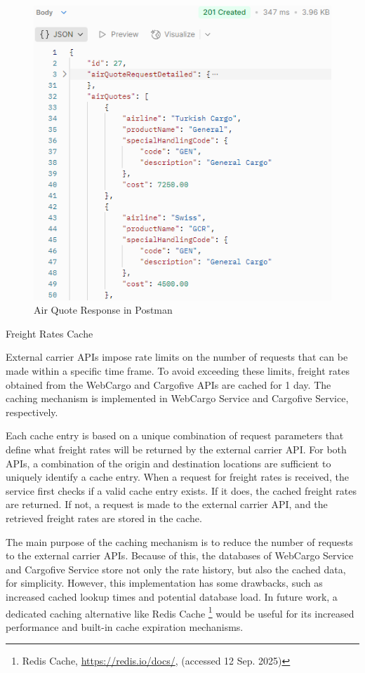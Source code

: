 \documentclass[12pt, reqno, oneside]{amsbook}
\makeatletter
\def\subsection{\@startsection{subsection}{2}%
      \z@{.5\linespacing\@plus.7\linespacing}{.25\linespacing}%
      {\normalfont\bfseries\flushleft}}
\theoremstyle{definition}
\theoremstyle{definition}
\numberwithin{section}{chapter}
\numberwithin{table}{chapter}
\numberwithin{figure}{chapter}
\makeatother
\begin{document}
\begin{figure}[H]
  \centering
  \includegraphics[width=0.8\linewidth]{images/AirQuoteResponsePostman.png}
  \caption{\label{Figure:AirQuoteResponsePostman}Air Quote Response in Postman}
\end{figure}

\pagebreak

\subsection{Freight Rates Cache}
\label{Subsection:Freight_Rates_Cache}

External carrier \acp{API} impose rate limits on the number of requests that can be made within a specific time frame. To avoid exceeding these limits, freight rates obtained from the WebCargo and Cargofive \Acp{API} are cached for 1 day. The caching mechanism is implemented in WebCargo Service and Cargofive Service, respectively.

Each cache entry is based on a unique combination of request parameters that define what freight rates will be returned by the external carrier \ac{API}. For both \acp{API}, a combination of the origin and destination locations are sufficient to uniquely identify a cache entry. When a request for freight rates is received, the service first checks if a valid cache entry exists. If it does, the cached freight rates are returned. If not, a request is made to the external carrier \ac{API}, and the retrieved freight rates are stored in the cache.

The main purpose of the caching mechanism is to reduce the number of requests to the external carrier \acp{API}. Because of this, the databases of WebCargo Service and Cargofive Service store not only the rate history, but also the cached data, for simplicity. However, this implementation has some drawbacks, such as increased cached lookup times and potential database load. In future work, a dedicated caching alternative like Redis Cache \footnote{Redis Cache, \url{https://redis.io/docs/}, (accessed 12 Sep. 2025)} would be useful for its increased performance and built-in cache expiration mechanisms.
\end{document}
